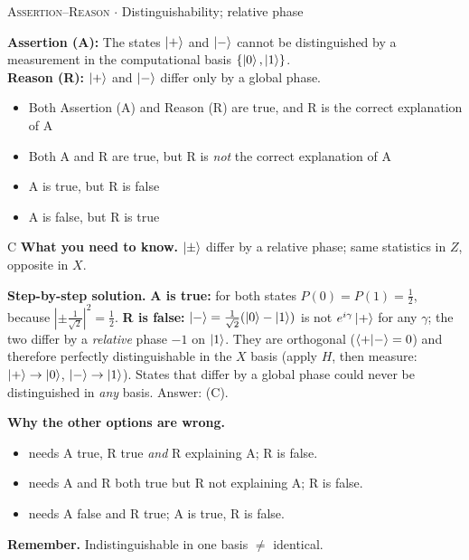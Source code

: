 \documentclass[11pt,a4paper]{article}
\newcommand{\optlabel}[1]{\textbf{(#1)}}
\newcommand{\correctlabel}[1]{\textcolor{okgreen}{\textbf{(#1)}\,\ding{51}}}
\newenvironment{qitem}[1]{\begin{list}{}{\setlength{\leftmargin}{3.3em}\setlength{\labelwidth}{3.1em}%
  \setlength{\labelsep}{0.2em}\setlength{\topsep}{3pt}\setlength{\parsep}{3pt}}\item[\textbf{Q.#1}\hfill]}{\end{list}}
\newcommand{\qsep}{\par\vspace{2pt}{\color{black!15}\hrule}\vspace{4pt}}
\newcommand{\qmeta}[2]{{\footnotesize\color{black!60}\textsc{#1} \;$\cdot$\; #2}\par}
\begin{document}
\begin{qitem}{37}
\qmeta{Assertion--Reason}{Distinguishability; relative phase}
\textbf{Assertion (A):} The states $\ket{+}$ and $\ket{-}$ cannot be distinguished by a measurement in the computational
basis $\{\ket0, \ket1\}$.\\[1mm]
\textbf{Reason (R):} $\ket{+}$ and $\ket{-}$ differ only by a global phase.
\begin{itemize}[leftmargin=2.6em, labelsep=0.4em, itemsep=2pt, topsep=3pt]
\item[\optlabel{A}] Both Assertion (A) and Reason (R) are true, and R is the correct explanation of A
\item[\optlabel{B}] Both A and R are true, but R is \emph{not} the correct explanation of A
\item[\correctlabel{C}] A is true, but R is false
\item[\optlabel{D}] A is false, but R is true
\end{itemize}
\end{qitem}
\begin{solbox}{C}
\textbf{\color{brand}What you need to know.} $\ket\pm$ differ by a relative phase; same statistics in $Z$, opposite in $X$.

\textbf{\color{brand}Step-by-step solution.} \textbf{A is true:} for both states $P(0) = P(1) = \frac12$, because $|\pm\frac{1}{\sqrt2}|^2 = \frac12$.
\textbf{R is false:} $\ket{-} = \frac{1}{\sqrt2}(\ket0 - \ket1)$ is not $e^{i\gamma}\ket{+}$ for any $\gamma$; the two differ by a
\emph{relative} phase $-1$ on $\ket1$. They are orthogonal ($\braket{+|-} = 0$) and therefore perfectly distinguishable in the
$X$ basis (apply $H$, then measure: $\ket{+}\to\ket0$, $\ket-\to\ket1$). States that differ by a global phase could never be
distinguished in \emph{any} basis. Answer: (C).

\textbf{\color{brand}Why the other options are wrong.}
\begin{itemize}[leftmargin=2.4em, itemsep=1pt, topsep=2pt]
\item[\textbf{(A)}] needs A true, R true \emph{and} R explaining A; R is false.
\item[\textbf{(B)}] needs A and R both true but R not explaining A; R is false.
\item[\textbf{(D)}] needs A false and R true; A is true, R is false.
\end{itemize}
\textbf{\color{brand}Remember.} Indistinguishable in one basis $\neq$ identical.
\end{solbox}
\qsep
\end{document}
